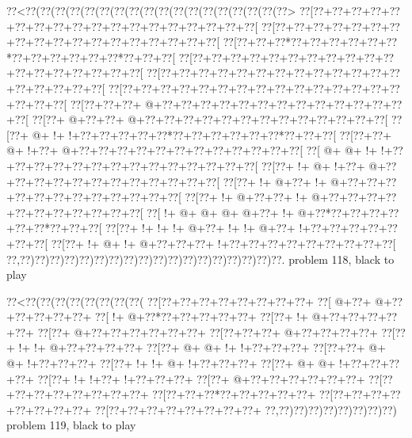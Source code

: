 \vbox{\vbox{\goo
\0??<\0??(\0??(\0??(\0??(\0??(\0??(\0??(\0??(\0??(\0??(\0??(\0??(\0??(\0??(\0??(\0??(\0??(\0??>
\0??[\0??+\0??+\0??+\0??+\0??+\0??+\0??+\0??+\0??+\0??+\0??+\0??+\0??+\0??+\0??+\0??+\0??+\0??[
\0??[\0??+\0??+\0??+\0??+\0??+\0??+\0??+\0??+\0??+\0??+\0??+\0??+\0??+\0??+\0??+\0??+\0??+\0??[
\0??[\0??+\0??+\0??*\0??+\0??+\0??+\0??+\0??+\0??*\0??+\0??+\0??+\0??+\0??+\0??*\0??+\0??+\0??[
\0??[\0??+\0??+\0??+\0??+\0??+\0??+\0??+\0??+\0??+\0??+\0??+\0??+\0??+\0??+\0??+\0??+\0??+\0??[
\0??[\0??+\0??+\0??+\0??+\0??+\0??+\0??+\0??+\0??+\0??+\0??+\0??+\0??+\0??+\0??+\0??+\0??+\0??[
\0??[\0??+\0??+\0??+\0??+\0??+\0??+\0??+\0??+\0??+\0??+\0??+\0??+\0??+\0??+\0??+\0??+\0??+\0??[
\0??[\0??+\0??+\0??+\- @+\0??+\0??+\0??+\0??+\0??+\0??+\0??+\0??+\0??+\0??+\0??+\0??+\0??+\0??[
\0??[\0??+\- @+\0??+\0??+\- @+\0??+\0??+\0??+\0??+\0??+\0??+\0??+\0??+\0??+\0??+\0??+\0??+\0??[
\0??[\0??+\- @+\- !+\- !+\0??+\0??+\0??+\0??+\0??*\0??+\0??+\0??+\0??+\0??+\0??*\0??+\0??+\0??[
\0??[\0??+\0??+\- @+\- !+\0??+\- @+\0??+\0??+\0??+\0??+\0??+\0??+\0??+\0??+\0??+\0??+\0??+\0??[
\0??[\- @+\- @+\- !+\- !+\0??+\0??+\0??+\0??+\0??+\0??+\0??+\0??+\0??+\0??+\0??+\0??+\0??+\0??[
\0??[\0??+\- !+\- @+\- !+\0??+\- @+\0??+\0??+\0??+\0??+\0??+\0??+\0??+\0??+\0??+\0??+\0??+\0??[
\0??[\0??+\- !+\- @+\0??+\- !+\- @+\0??+\0??+\0??+\0??+\0??+\0??+\0??+\0??+\0??+\0??+\0??+\0??[
\0??[\0??+\- !+\- @+\0??+\0??+\- !+\- @+\0??+\0??+\0??+\0??+\0??+\0??+\0??+\0??+\0??+\0??+\0??[
\0??[\- !+\- @+\- @+\- @+\- @+\0??+\- !+\- @+\0??*\0??+\0??+\0??+\0??+\0??+\0??*\0??+\0??+\0??[
\0??[\0??+\- !+\- !+\- !+\- @+\0??+\- !+\- !+\- @+\0??+\- !+\0??+\0??+\0??+\0??+\0??+\0??+\0??[
\0??[\0??+\- !+\- @+\- !+\- @+\0??+\0??+\0??+\- !+\0??+\0??+\0??+\0??+\0??+\0??+\0??+\0??+\0??[
\0??,\0??)\0??)\0??)\0??)\0??)\0??)\0??)\0??)\0??)\0??)\0??)\0??)\0??)\0??)\0??)\0??)\0??)\0??.
}
\hfil problem 118, black to play\hfil\break
}

\vbox{\vbox{\goo
\0??<\0??(\0??(\0??(\0??(\0??(\0??(\0??(\0??(
\0??[\0??+\0??+\0??+\0??+\0??+\0??+\0??+\0??+
\0??[\- @+\0??+\- @+\0??+\0??+\0??+\0??+\0??+
\0??[\- !+\- @+\0??*\0??+\0??+\0??+\0??+\0??+
\0??[\0??+\- !+\- @+\0??+\0??+\0??+\0??+\0??+
\0??[\0??+\- @+\0??+\0??+\0??+\0??+\0??+\0??+
\0??[\0??+\0??+\0??+\- @+\0??+\0??+\0??+\0??+
\0??[\0??+\- !+\- !+\- @+\0??+\0??+\0??+\0??+
\0??[\0??+\- @+\- @+\- !+\- !+\0??+\0??+\0??+
\0??[\0??+\0??+\- @+\- @+\- !+\0??+\0??+\0??+
\0??[\0??+\- !+\- !+\- @+\- !+\0??+\0??+\0??+
\0??[\0??+\- @+\- @+\- !+\0??+\0??+\0??+\0??+
\0??[\0??+\- !+\- !+\0??+\- !+\0??+\0??+\0??+
\0??[\0??+\- @+\0??+\0??+\0??+\0??+\0??+\0??+
\0??[\0??+\0??+\0??+\0??+\0??+\0??+\0??+\0??+
\0??[\0??+\0??+\0??*\0??+\0??+\0??+\0??+\0??+
\0??[\0??+\0??+\0??+\0??+\0??+\0??+\0??+\0??+
\0??[\0??+\0??+\0??+\0??+\0??+\0??+\0??+\0??+
\0??,\0??)\0??)\0??)\0??)\0??)\0??)\0??)\0??)
}
\hfil problem 119, black to play\hfil\break
}

